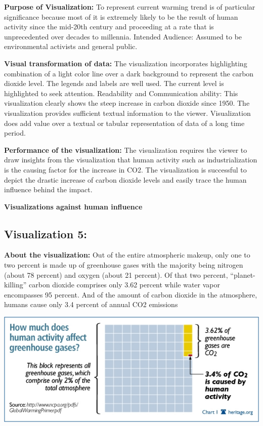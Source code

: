 \documentclass[]{book}
\begin{document}
\textbf{Purpose of Visualization:} To represent current warming trend is of particular significance because most of it is extremely likely to be the result of human activity since the mid-20th century and proceeding at a rate that is unprecedented over decades to millennia.
Intended Audience: Assumed to be environmental activists and general public.

\textbf{Visual transformation of data:} The visualization incorporates highlighting combination of a light color line over a dark background to represent the carbon dioxide level. The legends and labels are well used. The current level is highlighted to seek attention.
Readability and Communication ability: This visualization clearly shows the steep increase in carbon dioxide since 1950. The visualization provides sufficient textual information to the viewer. Visualization does add value over a textual or tabular representation of data of a long time period.

\textbf{Performance of the visualization:} The visualization requires the viewer to draw insights from the visualization that human activity such as industrialization is the causing factor for the increase in CO2. The visualization is successful to depict the drastic increase of carbon dioxide levels and easily trace the human influence behind the impact.

\textbf{Visualizations against human influence}

\hypertarget{visualization-5}{%
\subsection{Visualization 5:}\label{visualization-5}}

\textbf{About the visualization:} Out of the entire atmospheric makeup, only one to two percent is made up of greenhouse gases with the majority being nitrogen (about 78 percent) and oxygen (about 21 percent). Of that two percent, ``planet-killing'' carbon dioxide comprises only 3.62 percent while water vapor encompasses 95 percent. And of the amount of carbon dioxide in the atmosphere, humans cause only 3.4 percent of annual CO2 emissions

\includegraphics{_images/Vz5-Against.png}
\end{document}
